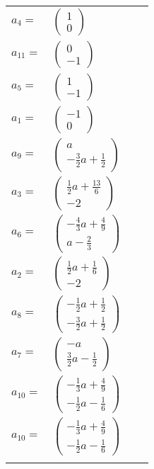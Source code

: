 \documentclass[1p]{elsarticle_modified}
\theoremstyle{definition}
\begin{document}
\begin{tabular}{m{7pt} m{180pt} m{7pt} m{180pt} }
\flushright $a_{4}=$&$\begin{pmatrix}1\\0\end{pmatrix}$ \\
\flushright $a_{11}=$&$\begin{pmatrix}0\\-1\end{pmatrix}$ \\
\flushright $a_{5}=$&$\begin{pmatrix}1\\-1\end{pmatrix}$ \\
\flushright $a_{1}=$&$\begin{pmatrix}-1\\0\end{pmatrix}$ \\
\flushright $a_{9}=$&$\begin{pmatrix}a\\-\frac{3}{2} a+\frac{1}{2}\end{pmatrix}$ \\
\flushright $a_{3}=$&$\begin{pmatrix}\frac{1}{2} a+\frac{13}{6}\\-2\end{pmatrix}$ \\
\flushright $a_{6}=$&$\begin{pmatrix}-\frac{4}{3} a+\frac{4}{9}\\a-\frac{2}{3}\end{pmatrix}$ \\
\flushright $a_{2}=$&$\begin{pmatrix}\frac{1}{2} a+\frac{1}{6}\\-2\end{pmatrix}$ \\
\flushright $a_{8}=$&$\begin{pmatrix}-\frac{1}{2} a+\frac{1}{2}\\-\frac{3}{2} a+\frac{1}{2}\end{pmatrix}$ \\
\flushright $a_{7}=$&$\begin{pmatrix}- a\\\frac{3}{2} a-\frac{1}{2}\end{pmatrix}$ \\
\flushright $a_{10}=$&$\begin{pmatrix}-\frac{1}{3} a+\frac{4}{9}\\-\frac{1}{2} a-\frac{1}{6}\end{pmatrix}$\\ \flushright $a_{10}=$&$\begin{pmatrix}-\frac{1}{3} a+\frac{4}{9}\\-\frac{1}{2} a-\frac{1}{6}\end{pmatrix}$\\&\end{tabular}
\end{document}

